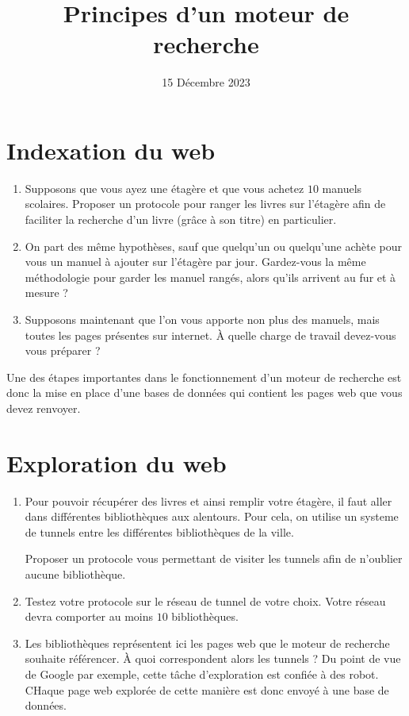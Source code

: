 \documentclass{article}
\title{Principes d'un moteur de recherche}
\date{15 Décembre 2023}
\begin{document}
\maketitle
\section{Indexation du web}
\begin{enumerate}[label=\emph{\alph*)}]
\item Supposons que vous ayez une étagère et que vous achetez $10$ manuels scolaires. Proposer un protocole pour ranger les livres sur l'étagère afin de faciliter la recherche d'un livre (grâce à son titre) en particulier.
\item On part des même hypothèses, sauf que quelqu'un ou quelqu'une achète pour vous un manuel à ajouter sur l'étagère par jour. Gardez-vous la même méthodologie pour garder les manuel rangés, alors qu'ils arrivent au fur et à mesure ?
\item Supposons maintenant que l'on vous apporte non plus des manuels, mais toutes les pages présentes sur internet. À quelle charge de travail devez-vous vous préparer ?
\end{enumerate}
Une des étapes importantes dans le fonctionnement d'un moteur de recherche est donc la mise en place d'une bases de données qui contient les pages web que vous devez renvoyer.  
\section{Exploration du web}
\begin{enumerate}[label=\emph{\alph*)}]
\item Pour pouvoir récupérer des livres et ainsi remplir votre étagère, il faut aller dans différentes bibliothèques aux alentours. Pour cela, on utilise un systeme de tunnels entre les différentes bibliothèques de la ville.
\begin{center}
\end{center}
Proposer un protocole vous permettant de visiter les tunnels afin de n'oublier aucune bibliothèque.
\item Testez votre protocole sur le réseau de tunnel de votre choix. Votre réseau devra comporter au moins $10$ bibliothèques.
\item Les bibliothèques représentent ici les pages web que le moteur de recherche souhaite référencer. À quoi correspondent alors les tunnels ?
Du point de vue de Google par exemple, cette tâche d'exploration est confiée à des robot. CHaque page web explorée de cette manière est donc envoyé à une base de données.
\end{enumerate}
\end{document}
